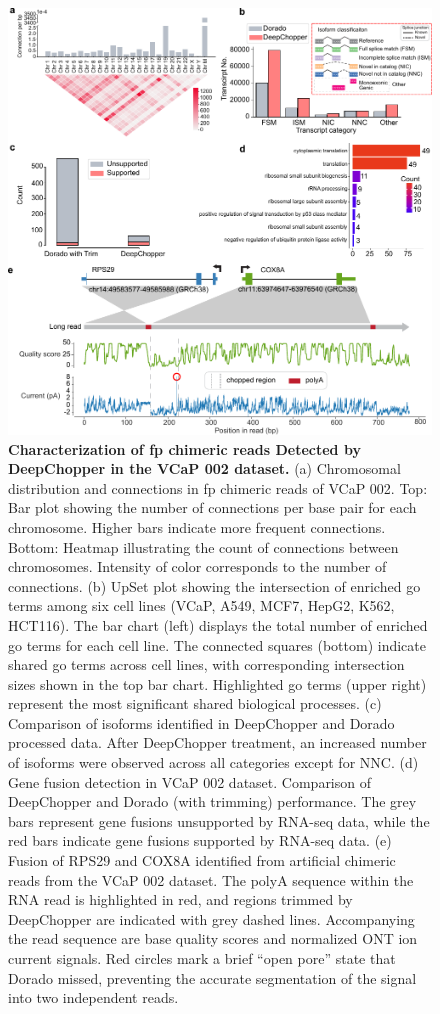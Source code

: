 \documentclass[pdflatex,sn-nature, lineno]{sn-jnl}%
\theoremstyle{thmstyleone}%
\theoremstyle{thmstyletwo}%
\theoremstyle{thmstylethree}%
\begin{document}
\begin{figure}[H]
	\includegraphics[height=1\columnwidth]{finals/figure2}
	\caption{{\bf Characterization of \gls{fp} chimeric reads Detected by DeepChopper in the VCaP 002 dataset.} (a) Chromosomal distribution and connections in \gls{fp} chimeric reads of VCaP 002. Top: Bar plot showing the number of connections per base pair for each chromosome. Higher bars indicate more frequent connections. Bottom: Heatmap illustrating the count of connections between chromosomes. Intensity of color corresponds to the number of connections. (b) UpSet plot showing the intersection of enriched \gls{go} terms among six cell lines (VCaP, A549, MCF7, HepG2, K562, HCT116). The bar chart (left) displays the total number of enriched \gls{go} terms for each cell line. The connected squares (bottom) indicate shared \gls{go} terms across cell lines, with corresponding intersection sizes shown in the top bar chart. Highlighted \gls{go} terms (upper right) represent the most significant shared biological processes. (c) Comparison of isoforms identified in DeepChopper and Dorado processed data. After DeepChopper treatment, an increased number of isoforms were observed across all categories except for NNC. (d) Gene fusion detection in VCaP 002 dataset. Comparison of DeepChopper and Dorado (with trimming) performance. The grey bars represent gene fusions unsupported by RNA-seq data, while the red bars indicate gene fusions supported by RNA-seq data. (e) Fusion of RPS29 and COX8A identified from artificial chimeric reads from the VCaP 002 dataset. The polyA sequence within the RNA read is highlighted in red, and regions trimmed by DeepChopper are indicated with grey dashed lines. Accompanying the read sequence are base quality scores and normalized ONT ion current signals. Red circles mark a brief ``open pore'' state that Dorado missed, preventing the accurate segmentation of the signal into two independent reads.}\label{fig:f2}
\end{figure}
\end{document}
